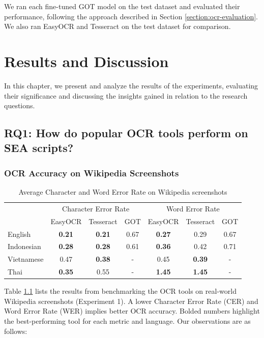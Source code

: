 \documentclass[12pt,oneside]{memoir}
\begin{document}
We ran each fine-tuned GOT model on the test dataset and evaluated their performance, following the approach described in Section \ref{section:ocr-evaluation}.
We also ran EasyOCR and Tesseract on the test dataset for comparison.

\chapter{Results and Discussion}

In this chapter, we present and analyze the results of the experiments, evaluating their significance and discussing the insights gained in relation to the research questions.

\section{RQ1: How do popular OCR tools perform on SEA scripts?}

\subsection{OCR Accuracy on Wikipedia Screenshots} \label{section:ocr-accuracy-on-wikipedia-screenshots}

\begin{table}[ht]
    \centering
    \caption{Average Character and Word Error Rate on Wikipedia screenshots}
    \label{table:ocr-accuracy-on-real-world-data}
    \begin{tabular}{lcccccc}
        \toprule
        & \multicolumn{3}{c}{Character Error Rate} & \multicolumn{3}{c}{Word Error Rate}\\
        \cmidrule(lr){2-4}\cmidrule(lr){5-7}
        & EasyOCR & Tesseract & GOT & EasyOCR & Tesseract & GOT\\
        \midrule
        English & \textbf{0.21} & \textbf{0.21} & 0.67 & \textbf{0.27} & 0.29 & 0.67\\
        Indonesian & \textbf{0.28} & \textbf{0.28} & 0.61 & \textbf{0.36} & 0.42 & 0.71\\
        Vietnamese & 0.47 & \textbf{0.38} & - & 0.45 & \textbf{0.39} & -\\
        Thai & \textbf{0.35} & 0.55 & - & \textbf{1.45} & \textbf{1.45} & -\\
        \bottomrule
    \end{tabular}
\end{table}

Table \ref{table:ocr-accuracy-on-real-world-data} lists the results from benchmarking the OCR tools on real-world Wikipedia screenshots (Experiment 1).
A lower Character Error Rate (CER) and Word Error Rate (WER) implies better OCR accuracy.
Bolded numbers highlight the best-performing tool for each metric and language. Our observations are as follows:
\end{document}
